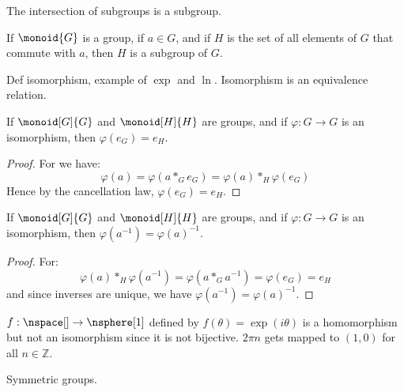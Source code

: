         \begin{theorem}
            The intersection of subgroups is a subgroup.
        \end{theorem}
        \begin{theorem}
            If $\monoid{G}$ is a group, if $a\in{G}$, and if $H$ is the set
            of all elements of $G$ that commute with $a$, then $H$ is a
            subgroup of $G$.
        \end{theorem}
        Def isomorphism, example of $\exp$ and $\ln$. Isomorphism is an
        equivalence relation.
        \begin{theorem}
            If $\monoid[G]{G}$ and $\monoid[H]{H}$ are groups, and if
            $\varphi:G\rightarrow{G}$ is an isomorphism, then
            $\varphi(e_{G})=e_{H}$.
        \end{theorem}
        \begin{proof}
            For we have:
            \begin{equation}
                \varphi(a)=\varphi(a*_{G}e_{G})
                          =\varphi(a)*_{H}\varphi(e_{G})
            \end{equation}
            Hence by the cancellation law, $\varphi(e_{G})=e_{H}$.
        \end{proof}
        \begin{theorem}
            If $\monoid[G]{G}$ and $\monoid[H]{H}$ are groups, and if
            $\varphi:G\rightarrow{G}$ is an isomorphism, then
            $\varphi(a^{\minus{1}})=\varphi(a)^{\minus{1}}$.
        \end{theorem}
        \begin{proof}
            For:
            \begin{equation}
                \varphi(a)*_{H}\varphi(a^{\minus{1}})
                    =\varphi(a*_{G}a^{\minus{1}})
                    =\varphi(e_{G})
                    =e_{H}
            \end{equation}
            and since inverses are unique, we have
            $\varphi(a^{\minus{1}})=\varphi(a)^{\minus{1}}$.
        \end{proof}
        \begin{example}
            $f:\nspace[]\rightarrow\nsphere[1]$ defined by
            $f(\theta)=\exp(i\theta)$ is a homomorphism but not an
            isomorphism since it is not bijective. $2\pi{n}$ gets mapped to
            $(1,0)$ for all $n\in\mathbb{Z}$.
        \end{example}
        Symmetric groups.
